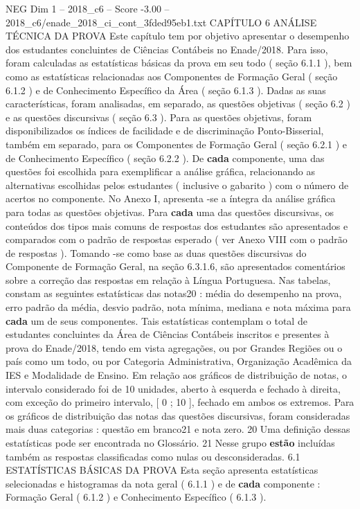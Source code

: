 \begin{textsample}{NEG Dim 1 – 2018\_c6 – Score -3.00 – 2018\_c6/enade\_2018\_ci\_cont\_3fded95eb1.txt}  \label{ex:f1_neg_195}
CAPÍTULO 6 ANÁLISE TÉCNICA DA PROVA Este capítulo tem por objetivo apresentar o desempenho dos estudantes concluintes de Ciências Contábeis no Enade/2018.
Para isso, foram calculadas as estatísticas básicas da prova em seu todo ( seção 6.1.1 ), bem como as estatísticas relacionadas aos Componentes de Formação Geral ( seção 6.1.2 ) e de Conhecimento Específico da Área ( seção 6.1.3 ).
Dadas as suas características, foram analisadas, em separado, as questões objetivas ( seção 6.2 ) e as questões discursivas ( seção 6.3 ).
Para as questões objetivas, foram disponibilizados os índices de facilidade e de discriminação Ponto-Bisserial, também em separado, para os Componentes de Formação Geral ( seção 6.2.1 ) e de Conhecimento Específico ( seção 6.2.2 ).
De \textbf{cada} componente, uma das questões foi escolhida para exemplificar a análise gráfica, relacionando as alternativas escolhidas pelos estudantes ( inclusive o gabarito ) com o número de acertos no componente.
No Anexo I, apresenta -se a íntegra da análise gráfica para todas as questões objetivas.
Para \textbf{cada} uma das questões discursivas, os conteúdos dos tipos mais comuns de respostas dos estudantes são apresentados e comparados com o padrão de respostas esperado ( ver Anexo VIII com o padrão de respostas ).
Tomando -se como base as duas questões discursivas do Componente de Formação Geral, na seção 6.3.1.6, são apresentados comentários sobre a correção das respostas em relação à Língua Portuguesa.
Nas tabelas, constam as seguintes estatísticas das notas20 : média do desempenho na prova, erro padrão da média, desvio padrão, nota mínima, mediana e nota máxima para \textbf{cada} um de seus componentes.
Tais estatísticas contemplam o total de estudantes concluintes da Área de Ciências Contábeis inscritos e presentes à prova do Enade/2018, tendo em vista agregações, ou por Grandes Regiões ou o país como um todo, ou por Categoria Administrativa, Organização Acadêmica da IES e Modalidade de Ensino.
Em relação aos gráficos de distribuição de notas, o intervalo considerado foi de 10 unidades, aberto à esquerda e fechado à direita, com exceção do primeiro intervalo, [ 0 ; 10 ], fechado em ambos os extremos.
Para os gráficos de distribuição das notas das questões discursivas, foram consideradas mais duas categorias : questão em branco21 e nota zero. 20 Uma definição dessas estatísticas pode ser encontrada no Glossário. 21 Nesse grupo \textbf{estão} incluídas também as respostas classificadas como nulas ou desconsideradas. 6.1 ESTATÍSTICAS BÁSICAS DA PROVA Esta seção apresenta estatísticas selecionadas e histogramas da nota geral ( 6.1.1 ) e de \textbf{cada} componente : Formação Geral ( 6.1.2 ) e Conhecimento Específico ( 6.1.3 ).

\end{textsample}
